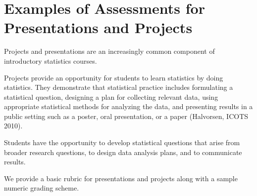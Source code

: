 \section{\textbf{Examples of Assessments for Presentations and Projects}}





Projects and presentations are an increasingly 
common component of introductory statistics courses. 


Projects provide an opportunity for 
students to learn statistics by doing statistics. They demonstrate that statistical practice includes
formulating a statistical question, designing a plan for collecting relevant data, using appropriate
statistical methods for analyzing the data, and presenting results in a public setting such as a poster,
oral presentation, or a paper (Halvorsen, ICOTS 2010). 


Students have the opportunity to 
develop statistical questions that arise from broader research questions, to design data
analysis plans, and to communicate results.


We provide a basic rubric for presentations and projects along with a sample numeric grading scheme.

